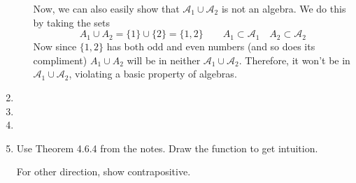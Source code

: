 \documentclass[12pt]{article}
\theoremstyle{plain}
\theoremstyle{definition}
\theoremstyle{remark}
\begin{document}
\begin{enumerate}
\begin{enumerate}
Now, we can also easily show that $\mathscr{A}_1 \cup \mathscr{A}_2$ is not an algebra. We do this by taking the sets
\[
    A_1 \cup A_2 = \{1\} \cup \{2\} = \{1,2\}
    \qquad A_1 \subset \mathscr{A}_1
    \quad A_2 \subset \mathscr{A}_2
\]
Now since $\{1,2\}$ has both odd and even numbers (and so does its compliment) $A_1 \cup A_2$ will be in neither $\mathscr{A}_1 \cup \mathscr{A}_2$. Therefore, it won't be in $\mathscr{A}_1 \cup \mathscr{A}_2$, violating a basic property of algebras.

\end{enumerate}

\item 
\item 
\item 
\item Use Theorem 4.6.4 from the notes. Draw the function to get intuition.

For other direction, show contrapositive.


\end{enumerate}
\end{document}
